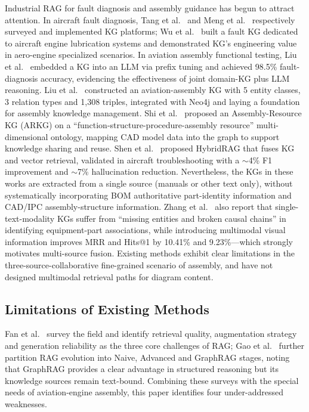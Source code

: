 \documentclass[applsci,article,submit,pdftex,moreauthors]{Definitions/mdpi}
\begin{document}
Industrial RAG for fault diagnosis and assembly guidance has begun to attract attention. In aircraft fault diagnosis, Tang et al.~\citep{tang2023aircraft} and Meng et al.~\citep{meng2024aircraft} respectively surveyed and implemented KG platforms; Wu et al.~\citep{wu2024engine} built a fault KG dedicated to aircraft engine lubrication systems and demonstrated KG's engineering value in aero-engine specialized scenarios. In aviation assembly functional testing, Liu et al.~\citep{liu2024jointkg} embedded a KG into an LLM via prefix tuning and achieved 98.5\% fault-diagnosis accuracy, evidencing the effectiveness of joint domain-KG plus LLM reasoning. Liu et al.~\citep{liu2023avkg} constructed an aviation-assembly KG with 5 entity classes, 3 relation types and 1{,}308 triples, integrated with Neo4j and laying a foundation for assembly knowledge management. Shi et al.~\citep{shi2022arkg} proposed an Assembly-Resource KG (ARKG) on a ``function-structure-procedure-assembly resource'' multi-dimensional ontology, mapping CAD model data into the graph to support knowledge sharing and reuse. Shen et al.~\citep{shen2025hybridrag} proposed HybridRAG that fuses KG and vector retrieval, validated in aircraft troubleshooting with a $\sim$4\% F1 improvement and $\sim$7\% hallucination reduction. Nevertheless, the KGs in these works are extracted from a single source (manuals or other text only), without systematically incorporating BOM authoritative part-identity information and CAD/IPC assembly-structure information. Zhang et al.~\citep{zhang2025mllmkgc} also report that single-text-modality KGs suffer from ``missing entities and broken causal chains'' in identifying equipment-part associations, while introducing multimodal visual information improves MRR and Hits@1 by 10.41\% and 9.23\%---which strongly motivates multi-source fusion. Existing methods exhibit clear limitations in the three-source-collaborative fine-grained scenario of assembly, and have not designed multimodal retrieval paths for diagram content.

\subsection{Limitations of Existing Methods}
\label{sec:limitation}

Fan et al.~\citep{fan2024ragsurvey} survey the field and identify retrieval quality, augmentation strategy and generation reliability as the three core challenges of RAG; Gao et al.~\citep{gao2023ragsurvey} further partition RAG evolution into Naive, Advanced and GraphRAG stages, noting that GraphRAG provides a clear advantage in structured reasoning but its knowledge sources remain text-bound. Combining these surveys with the special needs of aviation-engine assembly, this paper identifies four under-addressed weaknesses.
\end{document}
